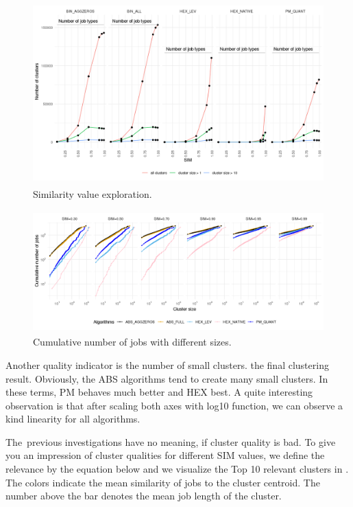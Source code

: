 \documentclass[]{llncs}
\begin{document}
\begin{figure}
  \centering
  \includegraphics[width=4.61in,height=2.76in]{./media/image19.png}
  \caption{Similarity value exploration.}
  \label{fig:sim_eploration}
\end{figure}

\begin{figure}
  \centering
  \includegraphics[width=4.61in,height=1.85in]{./media/image22.png}
  \caption{Cumulative number of jobs with different sizes.}
  \label{fig:cum_num_job_sizes}
\end{figure}

Another quality indicator is the number of small clusters.
 the final clustering result.
Obviously, the ABS algorithms tend to create many small clusters.
In these terms, PM behaves much better and HEX best.
A quite interesting observation is that after scaling both axes with log10 function, we can observe a kind linearity for all algorithms.

The\ previous investigations have no meaning, if cluster quality is bad.
To give you an  impression of cluster qualities for different SIM values, we define the relevance by the equation below and we visualize the Top 10 relevant clusters in
.
The colors indicate the mean similarity of jobs to the cluster centroid.
The number above the bar denotes the mean job length of the cluster.
\end{document}
